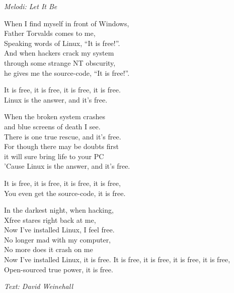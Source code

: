 {\footnotesize\textit{Melodi: Let It Be}}\par
\vspace{10pt}
When I find myself in front of Windows,\\
Father Torvalds comes to me,\\
Speaking words of Linux, ``It is free!''.\\
And when hackers crack my system\\
through some strange NT obscurity,\\
he gives me the source-code, ``It is free!''.\par
\vspace{10pt}
It is free, it is free, it is free, it is free.\\
Linux is the answer, and it's free.\par
\vspace{10pt}
When the broken system crashes\\
and blue screens of death I see.\\
There is one true rescue, and it's free.\\
For though there may be doubts first\\
it will sure bring life to your PC\\
'Cause Linux is the answer, and it's free.\par
\vspace{10pt}
It is free, it is free, it is free, it is free,\\
You even get the source-code, it is free.\par
\vspace{10pt}
In the darkest night, when hacking,\\
Xfree stares right back at me,\\
Now I've installed Linux, I feel free.\\
No longer mad with my computer,\\
No more does it crash on me\\
Now I've installed Linux, it is free.
\newpage
It is free, it is free, it is free, it is free,\\
Open-sourced true power, it is free.\par
\vspace{10pt}
{\footnotesize\textit{Text: David Weinehall}}
